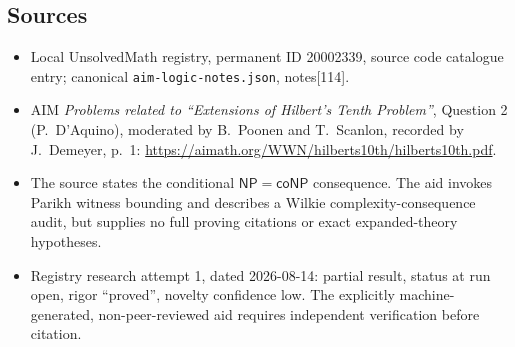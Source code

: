 \documentclass[11pt]{article}
\begin{document}
\subsection{Sources}
\begin{itemize}
\item Local UnsolvedMath registry, permanent ID 20002339, source code catalogue entry; canonical \texttt{aim-logic-notes.json}, notes[114].
\item AIM \emph{Problems related to ``Extensions of Hilbert's Tenth Problem''}, Question 2 (P.~D'Aquino), moderated by B.~Poonen and T.~Scanlon, recorded by J.~Demeyer, p.~1: \url{https://aimath.org/WWN/hilberts10th/hilberts10th.pdf}.
\item The source states the conditional $\mathsf{NP}=\mathsf{coNP}$ consequence. The aid invokes Parikh witness bounding and describes a Wilkie complexity-consequence audit, but supplies no full proving citations or exact expanded-theory hypotheses.
\item Registry research attempt 1, dated 2026-08-14: partial result, status at run open, rigor ``proved'', novelty confidence low. The explicitly machine-generated, non-peer-reviewed aid requires independent verification before citation.
\end{itemize}
\end{document}
